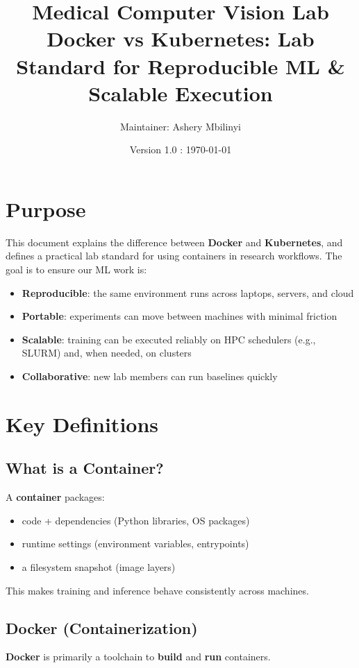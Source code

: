 \documentclass[11pt]{article}
\title{\textbf{Medical Computer Vision Lab \\ \small{
Docker vs Kubernetes: Lab Standard for Reproducible ML \& Scalable Execution}}}
\author{Maintainer: Ashery Mbilinyi}
\date{Version 1.0 : \today}
\begin{document}
\maketitle

\tableofcontents
\newpage

\section{Purpose}
This document explains the difference between \textbf{Docker} and \textbf{Kubernetes}, and defines a practical lab standard for using containers in research workflows.
The goal is to ensure our ML work is:
\begin{itemize}
  \item \textbf{Reproducible}: the same environment runs across laptops, servers, and cloud
  \item \textbf{Portable}: experiments can move between machines with minimal friction
  \item \textbf{Scalable}: training can be executed reliably on HPC schedulers (e.g., SLURM) and, when needed, on clusters
  \item \textbf{Collaborative}: new lab members can run baselines quickly
\end{itemize}

\section{Key Definitions}

\subsection{What is a Container?}
A \textbf{container} packages:
\begin{itemize}
  \item code + dependencies (Python libraries, OS packages)
  \item runtime settings (environment variables, entrypoints)
  \item a filesystem snapshot (image layers)
\end{itemize}
This makes training and inference behave consistently across machines.

\subsection{Docker (Containerization)}
\textbf{Docker} is primarily a toolchain to \textbf{build} and \textbf{run} containers.
\end{document}
